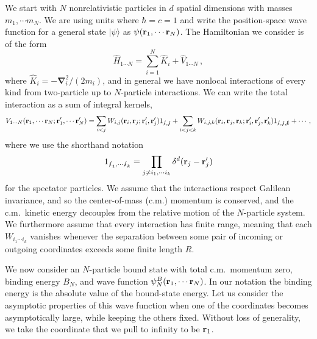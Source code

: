 \documentclass[aps,singlecolumn,superscriptaddress,nofootinbib,tightenlines,
preprintnumbers,showkeys]{revtex4-1}
\newcommand{\vNabla}{\boldsymbol{\nabla}}
\newcommand{\ket}[1]{|#1\rangle}
\begin{document}
We start with $N$ nonrelativistic particles in $d$ spatial dimensions with 
masses $m_1,\cdots m_N$.  We are using units where $\hbar=c=1$ and write the 
position-space wave function for a general state $\ket\psi$ as $\psi({\bf 
r}_1,\cdots{\bf r}_N)$.  The Hamiltonian we consider is of the form
%
\begin{equation}
 \hat{H}_{1\cdots N} = \sum_{i=1}^N \hat{K}_{i}+\hat{V}_{1\cdots N} \,,
\end{equation}
%
where $\hat{K}_{i} = {-\vNabla}^2_i/{(2m_i)}$, and in general we have nonlocal 
interactions of every kind from two-particle up to $N$-particle interactions.
We can write the total interaction as a sum of integral kernels,
%
\begin{equation}
 V_{1\cdots N}({\bf r}_1,\cdots{\bf r}_N ;{\bf r}'_1,\cdots{\bf r}'_N)
 = \sum_{i < j} W_{i,j}({\bf r}_i,{\bf r}_j;
 {\bf r}'_i,{\bf r}'_j)1_{\slashed{i},\slashed{j}}
 \null + \sum_{i< j< k}W_{i,j,k}({\bf r}_i,{\bf r}_j,{\bf r}_k;
 {\bf r}'_i,{\bf r}'_j,{\bf r}'_k)1_{\slashed{i},\slashed{j},\slashed{k}}
 + \cdots \,,
\label{eq:vtot}
\end{equation}
%
where we use the shorthand notation
%
\begin{equation}
 1_{\slashed{i}_1,\cdots\slashed{i}_k}
 = \prod_{j\ne{{i}_1,\cdots {i}_k}}\delta^d({\bf r}_j-{\bf r}'_j)
\end{equation}
%
for the spectator particles.  We assume that the interactions respect Galilean 
invariance, and so the center-of-mass (c.m.) momentum is conserved, and the 
c.m.\ kinetic energy decouples from the relative motion of the $N$-particle 
system.  We furthermore assume that every interaction has finite range, meaning 
that each $W_{i_1\cdots i_k}$ vanishes whenever the separation between some pair 
of incoming or outgoing coordinates exceeds some finite length $R$.

We now consider an $N$-particle bound state with total c.m.\ momentum zero,
binding energy $B_N$, and wave function $\psi^B_N({\bf r}_1,\cdots{\bf r}_N)$.  
In our notation the binding energy is the absolute value of the bound-state 
energy.  Let us consider the asymptotic properties of this wave function when 
one of the coordinates becomes asymptotically large, while keeping the others 
fixed.  Without loss of generality, we take the coordinate that we pull to 
infinity to be ${\bf r}_1$.
\end{document}
